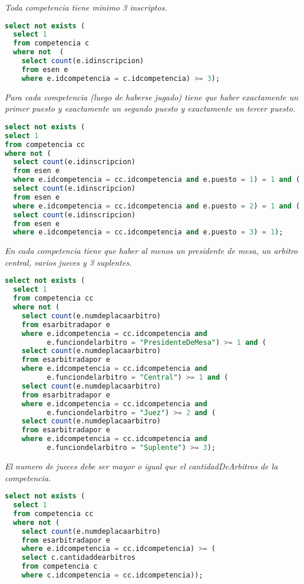 \emph{Toda competencia tiene minimo 3 inscriptos.}

\begin{lstlisting}[language=SQL]
select not exists (
  select 1
  from competencia c
  where not  (
    select count(e.idinscripcion)
    from esen e
    where e.idcompetencia = c.idcompetencia) >= 3);
\end{lstlisting}

\emph{Para cada competencia (luego de haberse jugado) tiene que haber exactamente un primer puesto y exactamente un segundo puesto y exactamente un tercer puesto.}

\begin{lstlisting}[language=SQL]
select not exists (
select 1
from competencia cc
where not (
  select count(e.idinscripcion)
  from esen e
  where e.idcompetencia = cc.idcompetencia and e.puesto = 1) = 1 and (
  select count(e.idinscripcion)
  from esen e
  where e.idcompetencia = cc.idcompetencia and e.puesto = 2) = 1 and (
  select count(e.idinscripcion)
  from esen e
  where e.idcompetencia = cc.idcompetencia and e.puesto = 3) = 1);
\end{lstlisting}

\emph{En cada competencia tiene que haber al menos un presidente de mesa, un arbitro central, varios jueces y 3 suplentes.}

\begin{lstlisting}[language=SQL]
select not exists (
  select 1
  from competencia cc
  where not (
    select count(e.numdeplacaarbitro)
    from esarbitradapor e
    where e.idcompetencia = cc.idcompetencia and
          e.funciondelarbitro = "PresidenteDeMesa") >= 1 and (
    select count(e.numdeplacaarbitro)
    from esarbitradapor e
    where e.idcompetencia = cc.idcompetencia and
          e.funciondelarbitro = "Central") >= 1 and (
    select count(e.numdeplacaarbitro)
    from esarbitradapor e
    where e.idcompetencia = cc.idcompetencia and
          e.funciondelarbitro = "Juez") >= 2 and (
    select count(e.numdeplacaarbitro)
    from esarbitradapor e
    where e.idcompetencia = cc.idcompetencia and
          e.funciondelarbitro = "Suplente") >= 3);
\end{lstlisting}

\emph{El numero de jueces debe ser mayor o igual que el cantidadDeArbitros de la competencia.}

\begin{lstlisting}[language=SQL]
select not exists (
  select 1
  from competencia cc
  where not (
    select count(e.numdeplacaarbitro)
    from esarbitradapor e
    where e.idcompetencia = cc.idcompetencia) >= (
    select c.cantidaddearbitros
    from competencia c
    where c.idcompetencia = cc.idcompetencia));
\end{lstlisting}

